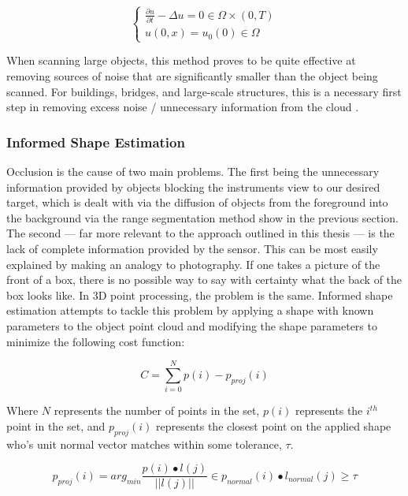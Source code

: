 \documentclass[12pt]{drexelthesis}
\let\Oldsubsubsection\subsubsection
\renewcommand{\subsubsection}{\FloatBarrier\Oldsubsubsection}
\begin{document}
\begin{equation}
		\begin{cases}
			\frac{\partial u}{\partial t} - \Delta u = 0 \in \Omega \times (0,T) \\
			u(0,x) = u_{0}(0) \in \Omega
		\end{cases}
\end{equation}

When scanning large objects, this method proves to be quite effective at removing sources of noise that are significantly smaller than the object being scanned. For buildings, bridges, and large-scale structures, this is a necessary first step in removing excess noise / unnecessary information from the cloud \cite{RN13}.

\subsubsection{Informed Shape Estimation}
\label{subsubsec:informedshape}
Occlusion is the cause of two main problems. The first being the unnecessary information provided by objects blocking the instruments view to our desired target, which is dealt with via the diffusion of objects from the foreground into the background via the range segmentation method show in the previous section. The second --- far more relevant to the approach outlined in this thesis --- is the lack of complete information provided by the sensor. This can be most easily explained by making an analogy to photography. If one takes a picture of the front of a box, there is no possible way to say with certainty what the back of the box looks like. In 3D point processing, the problem is the same. Informed shape estimation attempts to tackle this problem by applying a shape with known parameters to the object point cloud and modifying the shape parameters to minimize the following cost function:

\begin{equation}
	C = \sum_{i=0}^{N}{p(i) - p_{proj}(i)}
\end{equation}

Where $N$ represents the number of points in the set, $p(i)$ represents the $i^{th}$ point in the set, and $p_{proj}(i)$ represents the closest point on the applied shape who's unit normal vector matches within some tolerance, $\tau$.

\begin{equation}
	p_{proj}(i) = arg_{min} \frac{p(i) \bullet l(j)}{||l(j)||} \in p_{normal}(i) \bullet l_{normal}(j) \geq \tau
\end{equation}
\end{document}
